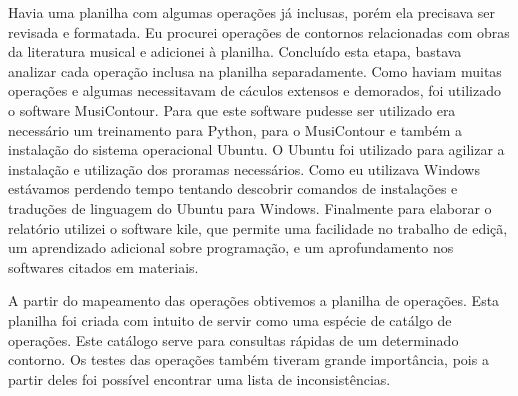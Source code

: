 \documentclass[11pt]{article}
\begin{document}
Havia uma planilha com algumas operações já inclusas, porém ela
precisava ser revisada e formatada.
Eu procurei operações de contornos relacionadas com obras da literatura
musical e adicionei à planilha. Concluído esta etapa, bastava
analizar cada operação inclusa na planilha separadamente. Como haviam
muitas operações e algumas necessitavam de cáculos extensos e
demorados, foi utilizado o software MusiContour. Para que este
software pudesse ser utilizado era necessário um treinamento para
Python, para o MusiContour e também a instalação do sistema
operacional Ubuntu. O Ubuntu foi utilizado para agilizar a instalação
e utilização dos proramas necessários. Como eu utilizava Windows
estávamos perdendo tempo tentando descobrir comandos de instalações e
traduções de linguagem do Ubuntu para Windows. Finalmente para
elaborar o relatório utilizei o software kile, que permite uma
facilidade no trabalho de ediçã, um aprendizado adicional sobre
programação, e um aprofundamento nos softwares citados em materiais.

\label{sec:resultados}



A partir do mapeamento das operações obtivemos a planilha de operações.
Esta planilha foi criada com intuito de servir como uma espécie de
catálgo de operações. Este catálogo serve para consultas rápidas de
um determinado contorno. Os testes das operações também tiveram grande
importância, pois a partir deles foi possível encontrar uma lista de
inconsistências.
\end{document}
